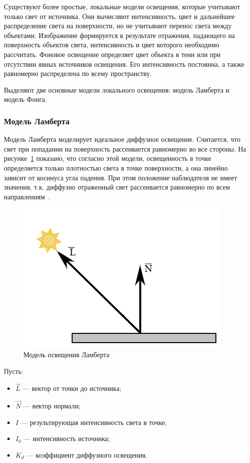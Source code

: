 Существуют более простые, локальные модели освещения, которые учитывают только свет от источника. 
Они вычисляют интенсивность, цвет и дальнейшее распределение света на поверхности, но не учитывают перенос света между объектами. 
Изображение формируется в результате отражения, падающего на поверхность объектов света, интенсивность и цвет которого необходимо рассчитать.
Фоновое освещение определяет цвет объекта в тени или при отсутствии явных источников освещения. Его интенсивность постоянна, а также равномерно распределена по всему пространству. 

Выделяют две основные модели локального освещения: модель Ламберта и модель Фонга.

\subsubsection{Модель Ламберта}
Модель Ламберта моделирует идеальное диффузное освещение. Считается, что свет при попадании на поверхность рассеивается равномерно во все стороны.
На рисунке~\ref{img:lambert} показано, что согласно этой модели, освещенность в точке определяется только плотностью света в точке поверхности, а она линейно зависит от косинуса угла падения. 
При этом положение наблюдателя не имеет значения, т.к. диффузно отраженный свет рассеивается равномерно по всем направлениям~\cite{light-model}.

\begin{figure}[h]
	\centering
	\includegraphics[height=0.3\textheight]{img/lambert.png}
	\caption{Модель освещения Ламберта}
	\label{img:lambert}
\end{figure}

Пусть:
\begin{itemize}
	\item $\overrightarrow L$ --- вектор от точки до источника;
	\item $\overrightarrow N$ --- вектор нормали;
	\item $I$ --- результирующая интенсивность света в точке;
	\item $I_0$ --- интенсивность источника;
	\item $K_d$ --- коэффициент диффузного освещения.
\end{itemize}

